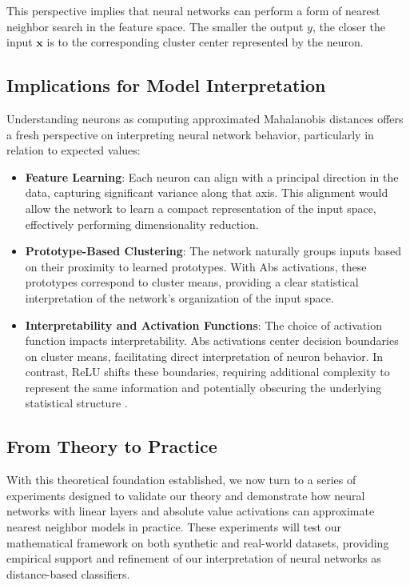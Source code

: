 This perspective implies that neural networks can perform a form of nearest neighbor search in the feature space. The smaller the output $y$, the closer the input $\mathbf{x}$ is to the corresponding cluster center represented by the neuron.

\subsection{Implications for Model Interpretation}

Understanding neurons as computing approximated Mahalanobis distances offers a fresh perspective on interpreting neural network behavior, particularly in relation to expected values:

\begin{itemize}
    \item \textbf{Feature Learning}: Each neuron can align with a principal direction in the data, capturing significant variance along that axis. This alignment would allow the network to learn a compact representation of the input space, effectively performing dimensionality reduction.
  
    \item \textbf{Prototype-Based Clustering}: The network naturally groups inputs based on their proximity to learned prototypes. With Abs activations, these prototypes correspond to cluster means, providing a clear statistical interpretation of the network's organization of the input space.

    \item \textbf{Interpretability and Activation Functions}: The choice of activation function impacts interpretability. Abs activations center decision boundaries on cluster means, facilitating direct interpretation of neuron behavior. In contrast, ReLU shifts these boundaries, requiring additional complexity to represent the same information and potentially obscuring the underlying statistical structure \citep{zeiler2014visualizing}.
\end{itemize}

\subsection{From Theory to Practice}

With this theoretical foundation established, we now turn to a series of experiments designed to validate our theory and demonstrate how neural networks with linear layers and absolute value activations can approximate nearest neighbor models in practice. These experiments will test our mathematical framework on both synthetic and real-world datasets, providing empirical support and refinement of our interpretation of neural networks as distance-based classifiers.
